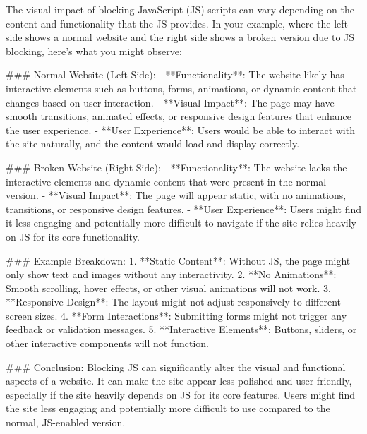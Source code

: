 The visual impact of blocking JavaScript (JS) scripts can vary depending on the content and functionality that the JS provides. In your example, where the left side shows a normal website and the right side shows a broken version due to JS blocking, here's what you might observe:

### Normal Website (Left Side):
- **Functionality**: The website likely has interactive elements such as buttons, forms, animations, or dynamic content that changes based on user interaction.
- **Visual Impact**: The page may have smooth transitions, animated effects, or responsive design features that enhance the user experience.
- **User Experience**: Users would be able to interact with the site naturally, and the content would load and display correctly.

### Broken Website (Right Side):
- **Functionality**: The website lacks the interactive elements and dynamic content that were present in the normal version.
- **Visual Impact**: The page will appear static, with no animations, transitions, or responsive design features.
- **User Experience**: Users might find it less engaging and potentially more difficult to navigate if the site relies heavily on JS for its core functionality.

### Example Breakdown:
1. **Static Content**: Without JS, the page might only show text and images without any interactivity.
2. **No Animations**: Smooth scrolling, hover effects, or other visual animations will not work.
3. **Responsive Design**: The layout might not adjust responsively to different screen sizes.
4. **Form Interactions**: Submitting forms might not trigger any feedback or validation messages.
5. **Interactive Elements**: Buttons, sliders, or other interactive components will not function.

### Conclusion:
Blocking JS can significantly alter the visual and functional aspects of a website. It can make the site appear less polished and user-friendly, especially if the site heavily depends on JS for its core features. Users might find the site less engaging and potentially more difficult to use compared to the normal, JS-enabled version.